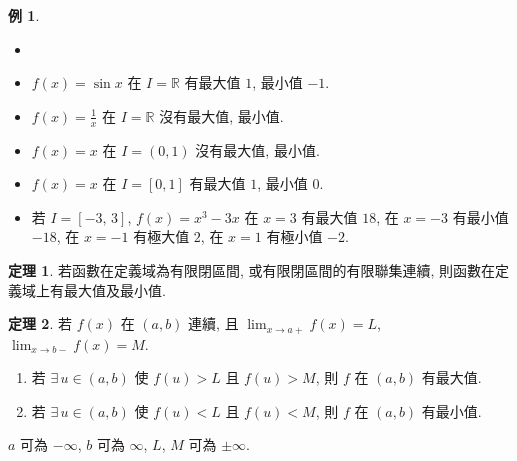 \documentclass[12pt]{extarticle}
\newcommand{\ds}{\displaystyle}
\theoremstyle{definition}
\newtheorem*{thm}{定理}
\newtheorem*{ex}{例}
\begin{document}
\begin{ex}
  \begin{itemize}\setlength\itemsep{0em}
    \item[]
    \item $\ds f(x) = \sin x$ 在 $I = \mathbb{R}$ 有最大值 $1$, 最小值 $-1$. 
    \item $\ds f(x) = \frac{1}{x}$ 在 $I = \mathbb{R}$ 沒有最大值, 最小值. 
    \item $\ds f(x) = x$ 在 $I = (0, 1)$ 沒有最大值, 最小值. 
    \item $\ds f(x) = x$ 在 $I = [0, 1]$ 有最大值 $1$, 最小值 $0$. 
    \item 若 $I = [-3,\,3]$, $\ds f(x) = x^3 - 3x$ 在 $x = 3$ 有最大值 $18$, 在 $x = -3$ 有最小值 $-18$, 在 $x = -1$ 有極大值 $2$, 在 $x = 1$ 有極小值 $-2$. 
  \end{itemize}
\end{ex}

\begin{thm}
  若函數在定義域為{\color{M4}有限閉區間}, 或{\color{M4}有限閉區間的有限聯集}連續, 則函數在定義域上有最大值及最小值. 
\end{thm}

\begin{thm}
  若 $f(x)$ 在 $(a, b)$ 連續, 且 $\ds\lim_{x\to a+}f(x) = L$, $\ds\lim_{x\to b-}f(x) = M$. 
  \begin{enumerate}\setlength\itemsep{0em}
    \item 若 $\exists\,u\in(a, b)$ 使 $f(u) > L$ 且 $f(u) > M$, 則 $f$ 在 $(a, b)$ 有最大值. 
    \item 若 $\exists\,u\in(a, b)$ 使 $f(u) < L$ 且 $f(u) < M$, 則 $f$ 在 $(a, b)$ 有最小值. 
  \end{enumerate}
  $a$ 可為 $-\infty$, $b$ 可為 $\infty$, $L$, $M$ 可為 $\pm\infty$. 
\end{thm}
\end{document}
